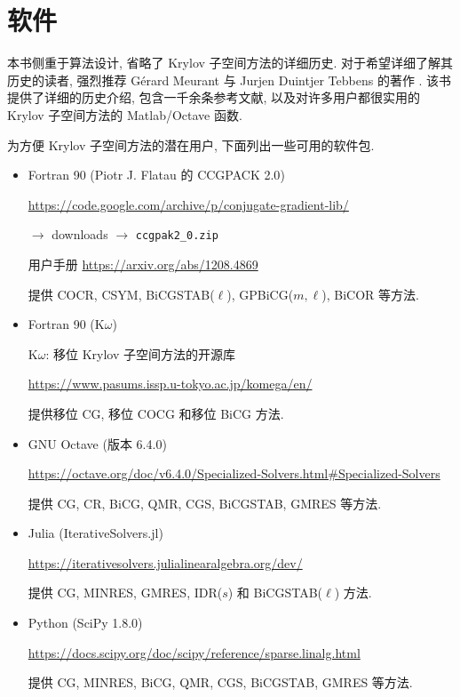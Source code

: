 \clearpage\section*{{软件}}
\makeatletter{}\label{chap:software}\makeatother

{本书侧重于算法设计, 省略了 Krylov 子空间方法的详细历史. 对于希望详细了解其历史的读者, 强烈推荐 Gérard Meurant 与 Jurjen Duintjer Tebbens 的著作 . 该书提供了详细的历史介绍, 包含一千余条参考文献, 以及对许多用户都很实用的 Krylov 子空间方法的 Matlab/Octave 函数.}

{为方便 Krylov 子空间方法的潜在用户, 下面列出一些可用的软件包.}

\begin{itemize}
\item Fortran 90 ({Piotr J. Flatau 的 CCGPACK 2.0})\par
\url{https://code.google.com/archive/p/conjugate-gradient-lib/}\par
$\to$ downloads $\to$ \texttt{ccgpak2\_0.zip}\par
{用户手册} \url{https://arxiv.org/abs/1208.4869}\par
{提供 COCR, CSYM, BiCGSTAB($\ell$), GPBiCG($m,\ell$), BiCOR 等方法.}

\item Fortran 90 (K$\omega$)\par
{K$\omega$: 移位 Krylov 子空间方法的开源库}\par
\url{https://www.pasums.issp.u-tokyo.ac.jp/komega/en/}\par
{提供移位 CG, 移位 COCG 和移位 BiCG 方法.}

\item GNU Octave ({版本 6.4.0})\par
\url{https://octave.org/doc/v6.4.0/Specialized-Solvers.html#Specialized-Solvers}\par
{提供 CG, CR, BiCG, QMR, CGS, BiCGSTAB, GMRES 等方法.}

\item Julia (IterativeSolvers.jl)\par
\url{https://iterativesolvers.julialinearalgebra.org/dev/}\par
{提供 CG, MINRES, GMRES, IDR($s$) 和 BiCGSTAB($\ell$) 方法.}

\item Python (SciPy 1.8.0)\par
\url{https://docs.scipy.org/doc/scipy/reference/sparse.linalg.html}\par
{提供 CG, MINRES, BiCG, QMR, CGS, BiCGSTAB, GMRES 等方法.}
\end{itemize}
